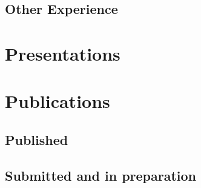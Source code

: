 \documentclass[letterpaper]{twentysecondcv} %
\begin{document}
\begin{finalpages}
\subsection{Other Experience}
\begin{twentyfull}
\end{twentyfull}

\section{Presentations}
\begin{twentyfull}
\end{twentyfull}

\section{Publications}
\subsection{Published}
\begin{itemize}
\end{itemize}

\subsection{Submitted and in preparation}
\begin{itemize}
\end{itemize}
\end{finalpages}
\end{document}
